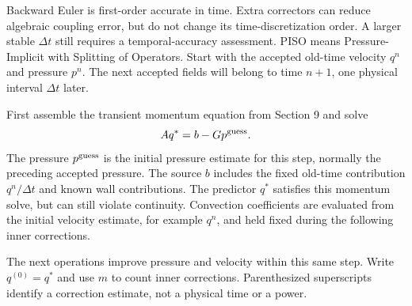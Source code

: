 Backward Euler is first-order accurate in time. Extra correctors can reduce algebraic coupling error, but do not change its time-discretization order. A larger stable $\Delta t$ still requires a temporal-accuracy assessment.
\newpage
{}
PISO means Pressure-Implicit with Splitting of Operators. Start with the
accepted old-time velocity $q^n$ and pressure $p^n$. The next accepted fields
will belong to time $n+1$, one physical interval $\Delta t$ later.

First assemble the transient momentum equation from Section 9 and solve
\[
Aq^*=b-Gp^{\rm guess}.
\]
The pressure $p^{\rm guess}$ is the initial pressure estimate for this step,
normally the preceding accepted pressure. The source $b$ includes the fixed
old-time contribution $q^n/\Delta t$ and known wall contributions. The
predictor $q^*$ satisfies this momentum solve, but can still violate continuity.
Convection coefficients are evaluated from the initial velocity estimate,
for example $q^n$, and held fixed during the following inner corrections.

The next operations improve pressure and velocity within this same step.
Write $q^{(0)}=q^*$ and use $m$ to count inner corrections. Parenthesized
superscripts identify a correction estimate, not a physical time or a power.

